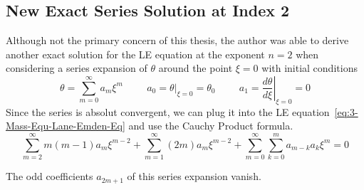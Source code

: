 \subsection{New Exact \texorpdfstring{}{LE} Series Solution at Index 2}
\label{subsec:99-app-new-exact-le-sol-n2}
Although not the primary concern of this thesis, the author was able to derive another exact solution for the \ac{LE} equation at the exponent $n=2$ when
considering a series expansion of $\theta$ around the point $\xi=0$ with initial conditions
\begin{equation}
	\theta=\sum\limits_{m=0}^\infty a_m\xi^m \hspace{1cm} a_0=\left.\theta\right|_{\xi=0}=\theta_0
	\hspace{1cm} a_1=\left.\frac{d\theta}{d\xi}\right|_{\xi=0}=0
	\label{eq:99-App-LEN2-Series-Initial-Conditions}
\end{equation}
Since the series is absolut convergent, we can plug it into the \ac{LE} equation~\ref{eq:3-Mass-Equ-Lane-Emden-Eq} and use the Cauchy Product formula.
\begin{equation}
	\sum\limits_{m=2}^\infty m(m-1)a_m\xi^{m-2}+\sum\limits_{m=1}^\infty (2m)a_m\xi^{m-2} +
	\sum\limits_{m=0}^\infty\sum\limits_{k=0}^m a_{m-k}a_k\xi^m = 0
	\label{eq:99-App-LEN2-Series-PluggedIn}
\end{equation}
\begin{theorem}
	The odd coefficients $a_{2m+1}$ of this series expansion vanish.
\end{theorem}
